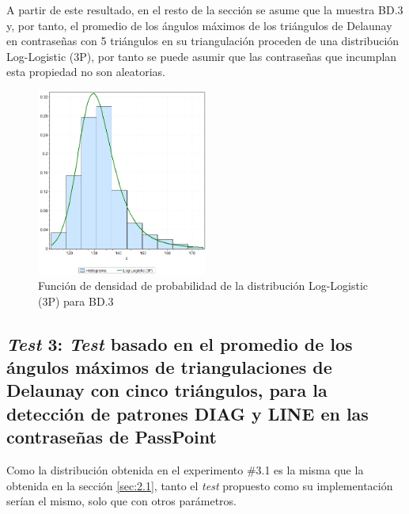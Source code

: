 \documentclass[12pt]{report}
\begin{document}
A partir de este resultado, en el resto de la sección se asume que la muestra  BD.3 y, por tanto, el promedio de los ángulos máximos de los triángulos de Delaunay en contraseñas con 5 triángulos en su triangulación  proceden de una distribución Log-Logistic (3P), por tanto se puede asumir que las contraseñas que incumplan esta propiedad no son aleatorias.
\begin{figure}[ht]
	\centering
	
	\includegraphics[width=0.5\textwidth]{5td_fdp.png}
	\caption{Función de densidad de probabilidad de la  distribución Log-Logistic (3P) para BD.3}
	\label{5TD_FDP}
\end{figure}

\newpage
\subsection{\textit{Test} 3: \textit{Test} basado en el promedio de los ángulos máximos de triangulaciones de Delaunay con cinco triángulos, para la detección de patrones DIAG y LINE en las contraseñas de PassPoint}
\label{sec:3.2}

Como la distribución   obtenida en el experimento \#3.1 es la misma que la obtenida en la sección \ref{sec:2.1}, tanto el \textit{test} propuesto como su implementación  serían el mismo, solo que con otros parámetros.

\end{document}
